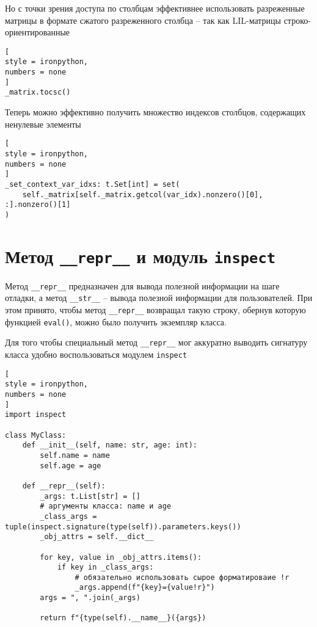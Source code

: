 \documentclass[%
	11pt,
	a4paper,
	utf8,
		]{article}
\begin{document}
Но с точки зрения доступа по столбцам эффективнее использовать разреженные матрицы в формате сжатого разреженного столбца -- так как LIL-матрицы строко-ориентированные
\begin{lstlisting}[
style = ironpython,
numbers = none
]
_matrix.tocsc()
\end{lstlisting}

Теперь можно эффективно получить множество индексов столбцов, содержащих ненулевые элементы
\begin{lstlisting}[
style = ironpython,
numbers = none
]
_set_context_var_idxs: t.Set[int] = set(
    self._matrix[self._matrix.getcol(var_idx).nonzero()[0], :].nonzero()[1]
)
\end{lstlisting}





\section{Метод \texttt{\_\_repr\_\_} и модуль \texttt{inspect}}

Метод \verb|__repr__| предназначен для вывода полезной информации на шаге отладки, а метод \verb|__str__| -- вывода полезной информации для пользователей. При этом принято, чтобы метод \verb|__repr__| возвращал такую строку, обернув которую функцией \verb|eval()|, можно было получить экземпляр класса.
	
Для того чтобы специальный метод \verb|__repr__| мог аккуратно выводить сигнатуру класса удобно воспользоваться модулем \verb|inspect|
\begin{lstlisting}[
style = ironpython,
numbers = none
]
import inspect

class MyClass:
    def __init__(self, name: str, age: int):
        self.name = name
        self.age = age
        
    def __repr__(self):
        _args: t.List[str] = []
        # аргументы класса: name и age
        _class_args = tuple(inspect.signature(type(self)).parameters.keys())
        _obj_attrs = self.__dict__
        
        for key, value in _obj_attrs.items():
            if key in _class_args:
                # обязательно использовать сырое форматироваие !r
                _args.append(f"{key}={value!r}")  
        args = ", ".join(_args)
        
        return f"{type(self).__name__}({args})
\end{lstlisting}
\end{document}
